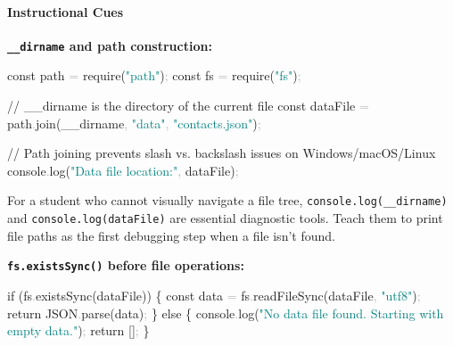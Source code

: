 \documentclass[
  justified,
  openright,
]{tufte-book}
\let\paragraph\paragraph
\newcommand{\BuiltInTok}[1]{#1}
\newcommand{\CommentTok}[1]{\textcolor{MidGray}{#1}}
\newcommand{\ControlFlowTok}[1]{\textcolor{BrandBlue}{#1}}
\newcommand{\FunctionTok}[1]{\textcolor{BrandBlue}{#1}}
\newcommand{\KeywordTok}[1]{\textcolor{BrandBlue}{#1}}
\newcommand{\NormalTok}[1]{#1}
\newcommand{\OperatorTok}[1]{\textcolor{DarkGray}{#1}}
\newcommand{\PreprocessorTok}[1]{\textcolor{BrandAccent}{#1}}
\newcommand{\StringTok}[1]{\textcolor{Teal}{#1}}
\newenvironment{Shaded}{%
  \begin{snugshade}
}{%
  \end{snugshade}
}
\let\paragraph\paragraph
\begin{document}
\paragraph{Instructional Cues}\label{instructional-cues-8}

\textbf{\texttt{\_\_dirname} and path construction:}

\begin{Shaded}
\begin{Highlighting}[]
\KeywordTok{const}\NormalTok{ path }\OperatorTok{=} \PreprocessorTok{require}\NormalTok{(}\StringTok{"path"}\NormalTok{)}\OperatorTok{;}
\KeywordTok{const}\NormalTok{ fs }\OperatorTok{=} \PreprocessorTok{require}\NormalTok{(}\StringTok{"fs"}\NormalTok{)}\OperatorTok{;}

\CommentTok{// \_\_dirname is the directory of the current file}
\KeywordTok{const}\NormalTok{ dataFile }\OperatorTok{=}\NormalTok{ path}\OperatorTok{.}\FunctionTok{join}\NormalTok{(}\BuiltInTok{\_\_dirname}\OperatorTok{,} \StringTok{"data"}\OperatorTok{,} \StringTok{"contacts.json"}\NormalTok{)}\OperatorTok{;}

\CommentTok{// Path joining prevents slash vs. backslash issues on Windows/macOS/Linux}
\BuiltInTok{console}\OperatorTok{.}\FunctionTok{log}\NormalTok{(}\StringTok{"Data file location:"}\OperatorTok{,}\NormalTok{ dataFile)}\OperatorTok{;}
\end{Highlighting}
\end{Shaded}

For a student who cannot visually navigate a file tree,
\texttt{console.log(\_\_dirname)} and \texttt{console.log(dataFile)} are
essential diagnostic tools. Teach them to print file paths as the first
debugging step when a file isn't found.

\textbf{\texttt{fs.existsSync()} before file operations:}

\begin{Shaded}
\begin{Highlighting}[]
\ControlFlowTok{if}\NormalTok{ (fs}\OperatorTok{.}\FunctionTok{existsSync}\NormalTok{(dataFile)) \{}
  \KeywordTok{const}\NormalTok{ data }\OperatorTok{=}\NormalTok{ fs}\OperatorTok{.}\FunctionTok{readFileSync}\NormalTok{(dataFile}\OperatorTok{,} \StringTok{"utf8"}\NormalTok{)}\OperatorTok{;}
  \ControlFlowTok{return} \BuiltInTok{JSON}\OperatorTok{.}\FunctionTok{parse}\NormalTok{(data)}\OperatorTok{;}
\NormalTok{\} }\ControlFlowTok{else}\NormalTok{ \{}
  \BuiltInTok{console}\OperatorTok{.}\FunctionTok{log}\NormalTok{(}\StringTok{"No data file found. Starting with empty data."}\NormalTok{)}\OperatorTok{;}
  \ControlFlowTok{return}\NormalTok{ []}\OperatorTok{;}
\NormalTok{\}}
\end{Highlighting}
\end{Shaded}
\end{document}

